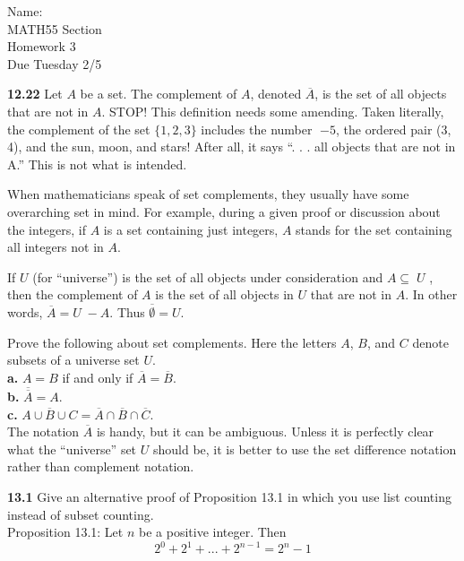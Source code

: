 \documentclass[10pt]{article}
\newcommand{\cmp}[1]{\overline{#1}}
\begin{document}
\begin{flushright}
	Name: \underline{\hspace{3cm}} \\
	MATH55 Section \underline{\hspace{0.5cm}} \\
	Homework 3 \\
	Due Tuesday 2/5
\end{flushright}

\begin{framed}
    \textbf{12.22} Let $A$ be a set. The complement of $A$, denoted $\cmp{A}$, is the set of all objects that are not in $A$. STOP! 
    This definition needs some amending. Taken literally, the complement of the set $\{1, 2, 3\}$ 
    includes the number 􏰏$-5$, the ordered pair (3, 4), and the sun, moon, and stars! After all, it says “. . . all objects that are not in A.” 
    This is not what is intended.

    When mathematicians speak of set complements, they usually have some overarching set in mind. 
    For example, during a given proof or discussion about the integers, if $A$ is a set containing just integers, 
    $A$ stands for the set containing all integers not in $A$.

    If $U$ (for “universe”) is the set of all objects under consideration and $A\subseteq􏰁 U$ , then the complement of $A$ is the set of 
    all objects in $U$ that are not in $A$. In other words, $\cmp{A} = U 􏰏- A$. Thus $\cmp{\emptyset} = U$.

    Prove the following about set complements. Here the letters $A$, $B$, and $C$ denote subsets of a universe set $U$.\\

    \indent \textbf{a.} $A=B$ if and only if $\cmp{A} = \cmp{B}$.\\
    \indent \textbf{b.} $\cmp{\cmp{A}} = A$.\\
    \indent \textbf{c.} $\cmp{A \cup B \cup C} = \cmp{A} \cap \cmp{B} \cap \cmp{C}$.\\

    The notation $\cmp{A}$ is handy, but it can be ambiguous. 
    Unless it is perfectly clear what the “universe” set $U$ should be, 
    it is better to use the set difference notation rather than complement notation.
\end{framed}

\pagebreak

\begin{framed}
    \textbf{13.1} Give an alternative proof of Proposition 13.1 in which you use list counting instead of subset counting.\\

    Proposition 13.1: Let $n$ be a positive integer. Then
    $$
    2^0+2^1+...+2^{n-1} = 2^{n}-1
    $$
\end{framed}
\end{document}

